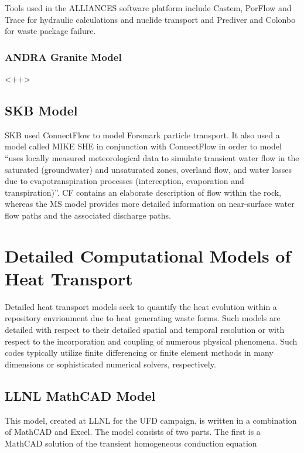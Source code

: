 {Tools used in the ALLIANCES software platform include Castem, PorFlow and Trace
for hydraulic calculations and nuclide transport and Prediver and Colonbo for
waste package failure.

\subsubsection{ANDRA Granite Model} 

<++>


\subsection{SKB Model} 
\gls{SKB} used ConnectFlow to model Forsmark particle
transport. It also used a model called MIKE SHE in conjunction with ConnectFlow
in order to model ``uses locally measured meteorological data to simulate
transient water flow in the saturated (groundwater) and unsaturated zones,
overland flow, and water losses due to evapotranspiration processes
(interception, evaporation and transpiration)''. CF contains an elaborate
description of flow within the rock, whereas the MS model provides more
detailed information on near-surface water flow paths and the associated
discharge paths.



\section{Detailed Computational Models of Heat Transport}
\label{sec:detailed_heat}


Detailed heat transport models seek to quantify the heat evolution within a 
repository envrionment due to heat generating waste forms. Such models are 
detailed with respect to their detailed spatial and temporal resolution or 
with respect to the incorporation and coupling of numerous physical phenomena. 
Such codes typically utilize finite differencing or finite element methods in 
many dimensions or sophisticated numerical solvers, respectively. 

\subsection{LLNL MathCAD Model}

This model, created at \gls{LLNL} for the \gls{UFD} campaign, is written in a 
combination of MathCAD and Excel. The model consists of two parts. The first is 
a MathCAD solution of the transient homogeneous conduction equation

}
